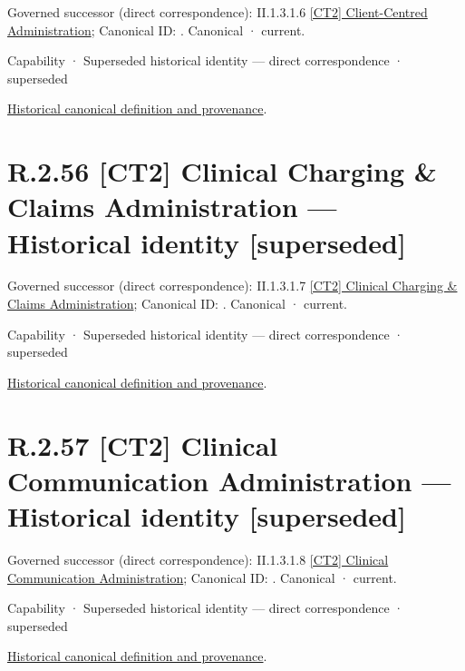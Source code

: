 {\small Governed successor (direct correspondence): II.1.3.1.6 \hyperref[element:8752b7a937754b2faa296300c6a48911]{[CT2] Client-Centred Administration}; Canonical ID: \texttt{}. Canonical · current.}\par
\label{element:232b3fb2ff204c9b9ff7a60ff6a7a32d}
{\small Capability · Superseded historical identity — direct correspondence · superseded}\par
\href{../../../../continuum/strategy/capability/232b3fb2ff204c9b9ff7a60ff6a7a32d.md}{Historical canonical definition and provenance}.\par
\section*{R.2.56 [CT2] Clinical Charging \& Claims Administration — Historical identity [superseded]}
\label{navigation:R.2.56}

{\small Governed successor (direct correspondence): II.1.3.1.7 \hyperref[element:af78ab7c89454a608cd4d34ec7703331]{[CT2] Clinical Charging \& Claims Administration}; Canonical ID: \texttt{}. Canonical · current.}\par
\label{element:44433108cc8f4f5f9d7581f9e5b29eb5}
{\small Capability · Superseded historical identity — direct correspondence · superseded}\par
\href{../../../../continuum/strategy/capability/44433108cc8f4f5f9d7581f9e5b29eb5.md}{Historical canonical definition and provenance}.\par
\section*{R.2.57 [CT2] Clinical Communication Administration — Historical identity [superseded]}
\label{navigation:R.2.57}

{\small Governed successor (direct correspondence): II.1.3.1.8 \hyperref[element:b38f2c2811724734b5887b6dbaaabbfc]{[CT2] Clinical Communication Administration}; Canonical ID: \texttt{}. Canonical · current.}\par
\label{element:bd4d6f4a7f03402ba7857383c7be7a4c}
{\small Capability · Superseded historical identity — direct correspondence · superseded}\par
\href{../../../../continuum/strategy/capability/bd4d6f4a7f03402ba7857383c7be7a4c.md}{Historical canonical definition and provenance}.\par
